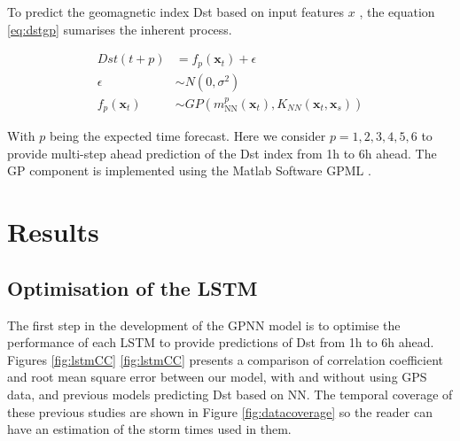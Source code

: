 

To predict the geomagnetic index Dst based on input features \( x \) , the equation \ref{eq:dstgp} sumarises 
the inherent process. 



\begin{align}\label{eq:dstgp}
Dst \left( t+p \right) &= f_{p} \left( \mathbf{x}_{t} \right) + \epsilon \\ 
\epsilon &\sim N \left( 0, \sigma ^{2} \right)  \\
f_{p} \left( \mathbf{x}_{t} \right)  &\sim 
GP \left( m^{p}_{\text{NN}}(\mathbf{x}_t) , K_{NN}(\mathbf{x}_{t}, \mathbf{x}_{s} ) \right)
\end{align}

With  \( p \)  being the expected time forecast. Here we consider $p  = {1,2,3,4,5,6}$ to provide 
multi-step ahead prediction of the Dst index from 1h to 6h ahead. The GP component is implemented using the 
Matlab Software GPML \citep{rasmussen2010gaussian}.


\section{Results} \label{sec:resultsgpnn}


\subsection{Optimisation of the LSTM}


The first step in the development of the GPNN model is to optimise the performance of each 
LSTM to provide predictions of Dst from 1h to 6h ahead. 
Figures \ref{fig:lstmCC} \ref{fig:lstmCC} presents a  comparison of correlation coefficient and root mean square error 
between our model, with and without using GPS data, and previous models predicting Dst based on NN. 
The temporal coverage of these previous studies are shown in Figure \ref{fig:datacoverage} so the reader 
can have an estimation of the storm times used in them. 

